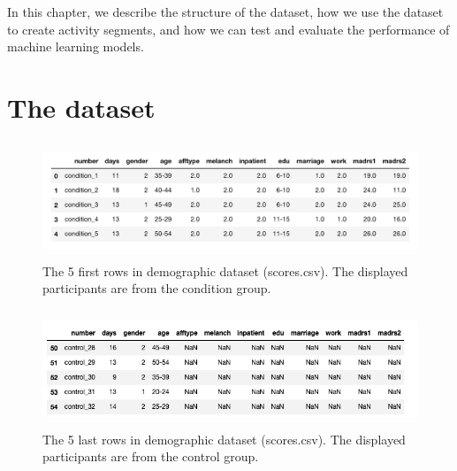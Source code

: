 In this chapter, we describe the structure of the dataset, how we use the dataset to create activity segments, and how we can test and evaluate the performance of machine learning models.

\section{The dataset}

\begin{figure}[h]
  \begin{center}
      \includegraphics[height=3.5cm]{img/demographics.png}
      \caption{The 5 first rows in demographic dataset (scores.csv). The displayed participants are from the condition group.}
      \label{figure:demographics}
  \end{center}
\end{figure}

\begin{figure}[h]
  \begin{center}
      \includegraphics[height=3.5cm]{img/demographics_control.png}
      \caption{The 5 last rows in demographic dataset (scores.csv). The displayed participants are from the control group.}
      \label{figure:demographics_control}
  \end{center}
\end{figure}


